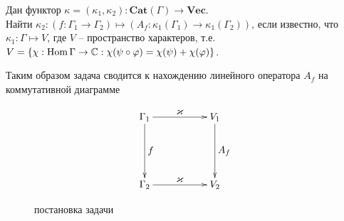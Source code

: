 
    Дан функтор $\kappa = (\kappa_1, \kappa_2): \mathbf{Cat}(\Gamma) \to 
    \mathbf{Vec}$.\\
    Найти $\kappa_2 : (f: \Gamma_1 \to \Gamma_2) \mapsto 
    (A_f: \kappa_1(\Gamma_1) \to \kappa_1(\Gamma_2))$, если известно, что 
    $\kappa_1 : \Gamma \mapsto V$, где $V$ -- пространство характеров, т.е. 
    $V = \{\chi: \operatorname*{Hom} \Gamma \to \mathbb{C}: \chi(\psi \circ \varphi) = 
    \chi(\psi) + \chi(\varphi)\}$.

    Таким образом задача сводится к нахождению линейного оператора $A_f$ на 
    коммутативной диаграмме 

    \begin{figure}[h]
        \centering
        \[\xymatrix{
            \Gamma_1 \ar[dd]^{\textstyle{f}} \ar[rr]^{\textstyle{\kappa}} & & V_1 \ar[dd]^{\textstyle{A_f}} \\
                                            & & \\
            \Gamma_2 \ar[rr]^{\textstyle{\kappa}}           & & V_2
        }\]
        \caption{постановка задачи}
        \label{cd_problem}
    \end{figure}